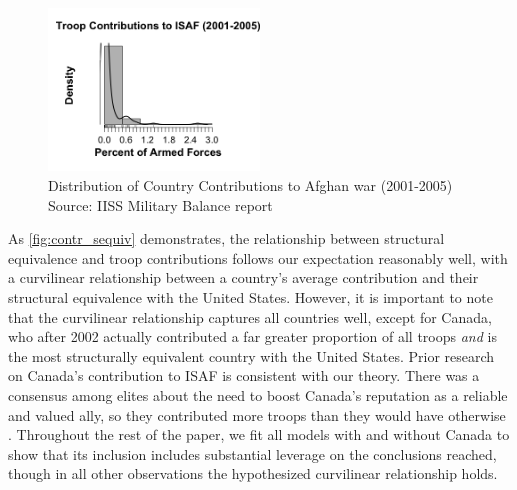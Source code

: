 \documentclass[12pt,letterpaper]{article}
\begin{document}
		\begin{figure}[ht]
			\centering
			\includegraphics[width=0.5\textwidth]{figures/troops_hist_largebin.png}
			\caption{Distribution of Country Contributions to Afghan war (2001-2005) Source: IISS Military Balance report}
			\label{fig:troop_hist}
		\end{figure}
		
		As \ref{fig:contr_sequiv} demonstrates, the relationship between structural equivalence and troop contributions follows our expectation reasonably well, with a curvilinear relationship between a country's average contribution and their structural equivalence with the United States. However, it is important to note that the curvilinear relationship captures all countries well, except for Canada, who after 2002 actually contributed a far greater proportion of all troops \textit{and} is the most structurally equivalent country with the United States. Prior research on Canada's contribution to ISAF is consistent with our theory. There was a consensus among elites about the need to boost Canada's reputation as a reliable and valued ally, so they contributed more troops than they would have otherwise \citep{massie_alliancevaluestatus_2018}. Throughout the rest of the paper, we fit all models with and without Canada to show that its inclusion includes substantial leverage on the conclusions reached, though in all other observations the hypothesized curvilinear relationship holds. 
		
\end{document}
